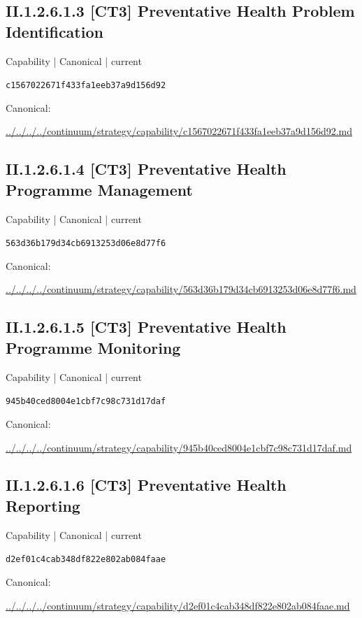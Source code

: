\documentclass[10pt,a4paper]{article}
\begin{document}
\subsection*{II.1.2.6.1.3 [CT3] Preventative Health Problem Identification}
{\small Capability | Canonical | current}\par
\texttt{c1567022671f433fa1eeb37a9d156d92}\par
Canonical: \par
{\footnotesize\url{../../../../continuum/strategy/capability/c1567022671f433fa1eeb37a9d156d92.md}}\par
\subsection*{II.1.2.6.1.4 [CT3] Preventative Health Programme Management}
{\small Capability | Canonical | current}\par
\texttt{563d36b179d34cb6913253d06e8d77f6}\par
Canonical: \par
{\footnotesize\url{../../../../continuum/strategy/capability/563d36b179d34cb6913253d06e8d77f6.md}}\par
\subsection*{II.1.2.6.1.5 [CT3] Preventative Health Programme Monitoring}
{\small Capability | Canonical | current}\par
\texttt{945b40ced8004e1cbf7c98c731d17daf}\par
Canonical: \par
{\footnotesize\url{../../../../continuum/strategy/capability/945b40ced8004e1cbf7c98c731d17daf.md}}\par
\subsection*{II.1.2.6.1.6 [CT3] Preventative Health Reporting}
{\small Capability | Canonical | current}\par
\texttt{d2ef01c4cab348df822e802ab084faae}\par
Canonical: \par
{\footnotesize\url{../../../../continuum/strategy/capability/d2ef01c4cab348df822e802ab084faae.md}}\par
\end{document}

